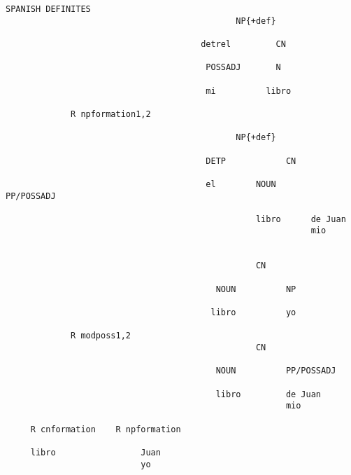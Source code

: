 \begin{verbatim}
SPANISH DEFINITES
                                              NP{+def}

                                       detrel         CN

                                        POSSADJ       N

                                        mi          libro
                                       
             R npformation1,2

                                              NP{+def}

                                        DETP            CN

                                        el        NOUN       PP/POSSADJ

                                                  libro      de Juan
                                                             mio


                                                  CN
                                            
                                          NOUN          NP

                                         libro          yo
                                                        
             R modposs1,2
                                                  CN

                                          NOUN          PP/POSSADJ

                                          libro         de Juan
                                                        mio

     R cnformation    R npformation

     libro                 Juan                           
                           yo

\end{verbatim}
\newpage
